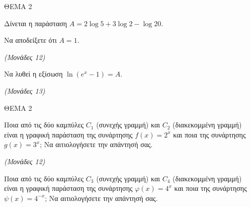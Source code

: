 \documentclass[11pt,a4paper,twoside]{book}
\newcommand{\monades}[1]{\hfill \textit{(Μονάδες #1)}}
\begin{document}
ΘΕΜΑ 2

Δίνεται η παράσταση $A = 2\log 5 + 3\log 2 - \log 20$.

\begin{alist}
\item Να αποδείξετε ότι $A = 1$.

\monades{12}

\item Να λυθεί η εξίσωση $\ln(e^x - 1) = A$.

\monades{13}
\end{alist}

\vspace{4mm}

ΘΕΜΑ 2

\begin{alist}
\item Ποια από τις δύο καμπύλες $C_{1}$ (συνεχής γραμμή) και $C_{2}$ (διακεκομμένη γραμμή) είναι η γραφική παράσταση της συνάρτησης $f(x) = 2^{x}$ και ποια της συνάρτησης $g(x) = 3^{x}$; Να αιτιολογήσετε την απάντησή σας.


\begin{center}


\end{center}


\monades{12}

\item Ποια από τις δύο καμπύλες $C_{3}$ (συνεχής γραμμή) και $C_{4}$ (διακεκομμένη γραμμή) είναι η γραφική παράσταση της συνάρτησης $\varphi(x) = 4^{x}$ και ποια της συνάρτησης $\psi(x) = 4^{- x}$; Να αιτιολογήσετε την απάντησή σας.



\end{alist}
\end{document}
